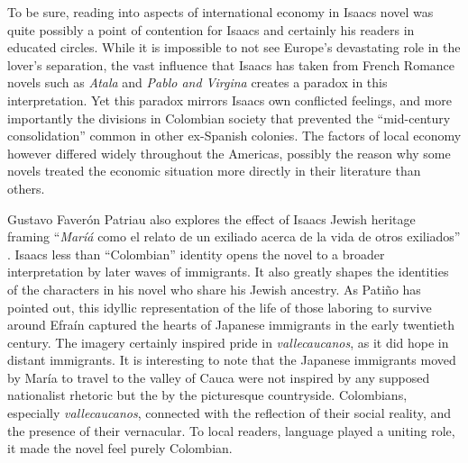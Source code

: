 \documentclass[12pt]{report}
\begin{document}
To be sure, reading into aspects of international economy in Isaacs novel was quite possibly a point of contention for Isaacs and certainly his readers in educated circles.
While it is impossible to not see Europe's devastating role in the lover's separation, the vast influence that Isaacs has taken from French Romance novels such as \textit{Atala} and \textit{Pablo and Virgina} creates a paradox in this interpretation.
Yet this paradox mirrors  Isaacs own conflicted feelings, and more importantly the divisions in Colombian society that prevented the \enquote{mid-century consolidation} common in other ex-Spanish colonies.
The factors of local economy however differed widely throughout the Americas, possibly the reason why some novels treated the economic situation more directly in their literature than others.

Gustavo Faverón Patriau also explores the effect of Isaacs Jewish heritage framing \enquote{\textit{Maríá} como el relato de un exiliado acerca de la vida de otros exiliados} \autocite[341]{Patriau2004}.
Isaacs less than \enquote{Colombian} identity opens the novel to a broader interpretation by later waves of immigrants.
It also greatly shapes the identities of the characters in his novel who share his Jewish ancestry.
As Patiño has pointed out, this idyllic representation of the life of those laboring to survive around Efraín captured the hearts of Japanese immigrants in the early twentieth century. 
The imagery certainly inspired pride in \textit{vallecaucanos}, as it did hope in distant immigrants. 
It is interesting to note that the Japanese immigrants moved by María to travel to the valley of Cauca were not inspired by any supposed nationalist rhetoric but the by the picturesque countryside.
Colombians, especially \textit{vallecaucanos}, connected with the reflection of their social reality, and the presence of their vernacular. 
To local readers, language played a uniting role, it made the novel feel purely Colombian. 
\end{document}
